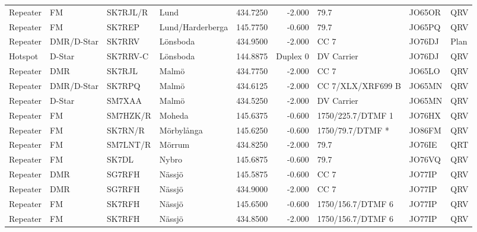 \begin{landscape}
\begin{longtable}{llllrrlll}
	Repeater & FM              & SK7RJL/R & Lund                 &     434.7250 &     -2.000 & 79.7              & JO65OR      & QRV      \\
	Repeater & FM              & SK7REP   & Lund/Harderberga     &     145.7750 &     -0.600 & 79.7              & JO65PQ      & QRV      \\
	Repeater & DMR/D-Star      & SK7RRV   & Lönsboda             &     434.9500 &     -2.000 & CC 7              & JO76DJ      & Plan     \\
	Hotspot  & D-Star          & SK7RRV-C & Lönsboda             &     144.8875 &   Duplex 0 & DV Carrier        & JO76DJ      & QRV      \\
	Repeater & DMR             & SK7RJL   & Malmö                &     434.7750 &     -2.000 & CC 7              & JO65LO      & QRV      \\
	Repeater & DMR/D-Star      & SK7RPQ   & Malmö                &     434.6125 &     -2.000 & CC 7/XLX/XRF699 B & JO65MN      & QRV      \\
	Repeater & D-Star          & SM7XAA   & Malmö                &     434.5250 &     -2.000 & DV Carrier        & JO65MN      & QRV      \\
	Repeater & FM              & SM7HZK/R & Moheda               &     145.6375 &     -0.600 & 1750/225.7/DTMF 1 & JO76HX      & QRV      \\
	Repeater & FM              & SK7RN/R  & Mörbylånga           &     145.6250 &     -0.600 & 1750/79.7/DTMF *  & JO86FM      & QRV      \\
	Repeater & FM              & SM7LNT/R & Mörrum               &     434.8250 &     -2.000 & 79.7              & JO76IE      & QRT      \\
	Repeater & FM              & SK7DL    & Nybro                &     145.6875 &     -0.600 & 79.7              & JO76VQ      & QRV      \\
	Repeater & DMR             & SG7RFH   & Nässjö               &     145.5875 &     -0.600 & CC 7              & JO77IP      & QRV      \\
	Repeater & DMR             & SG7RFH   & Nässjö               &     434.9000 &     -2.000 & CC 7              & JO77IP      & QRV      \\
	Repeater & FM              & SK7RFH   & Nässjö               &     145.6500 &     -0.600 & 1750/156.7/DTMF 6 & JO77IP      & QRV      \\
	Repeater & FM              & SK7RFH   & Nässjö               &     434.8500 &     -2.000 & 1750/156.7/DTMF 6 & JO77IP      & QRV      \\

\end{longtable}
\end{landscape}
